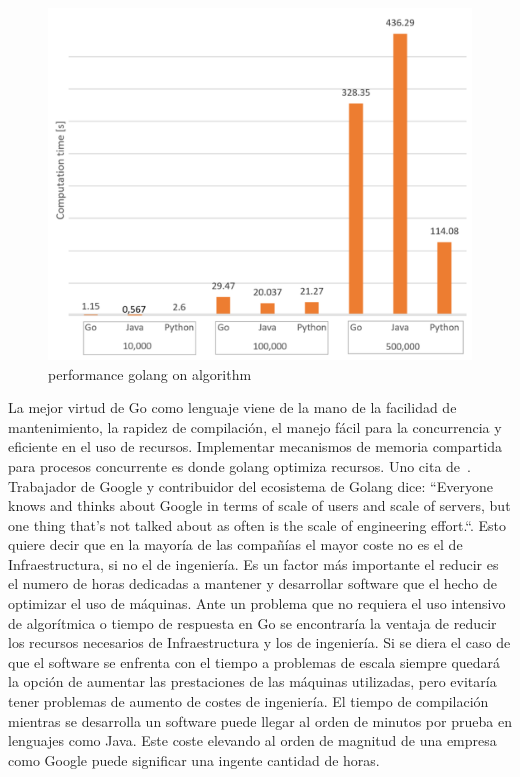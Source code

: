 \begin{figure}[H]
	\includegraphics[height=0.3\textheight]{./part/Proyecto_ejecutivo/memoria_constructiva/golang/img/compTime}
	\caption[Estudio comparativo de rendimiento de Go, Python y Java]{performance golang on algorithm\cite{Dymora20201}}\label{fig:performance golang}
\end{figure}

La mejor virtud de Go como lenguaje viene de la mano de la facilidad de mantenimiento, la rapidez de compilación, el manejo fácil para la concurrencia y eficiente en el uso de recursos.
Implementar mecanismos de memoria compartida para procesos concurrente es donde golang optimiza recursos.
Uno cita de~\cite{Meyerson2014104+101}.
Trabajador de Google y contribuidor del ecosistema de Golang dice:
“Everyone knows and thinks about Google in terms of scale of users and scale of servers, but one thing that's not talked about as often is the scale of engineering effort.“.
Esto quiere decir que en la mayoría de las compañías el mayor coste no es el de Infraestructura, si no el de ingeniería.
Es un factor más importante el reducir es el numero de horas dedicadas a mantener y desarrollar software que el hecho de optimizar el uso de máquinas.
Ante un problema que no requiera el uso intensivo de algorítmica o tiempo de respuesta en Go se encontraría la ventaja de reducir los recursos necesarios de Infraestructura y los de ingeniería.
Si se diera el caso de que el software se enfrenta con el tiempo a problemas de escala siempre quedará la opción de aumentar las prestaciones de las máquinas utilizadas, pero evitaría tener problemas de aumento de costes de ingeniería.
El tiempo de compilación mientras se desarrolla un software puede llegar al orden de minutos por prueba en lenguajes como Java.
Este coste elevando al orden de magnitud de una empresa como Google puede significar una ingente cantidad de horas.

